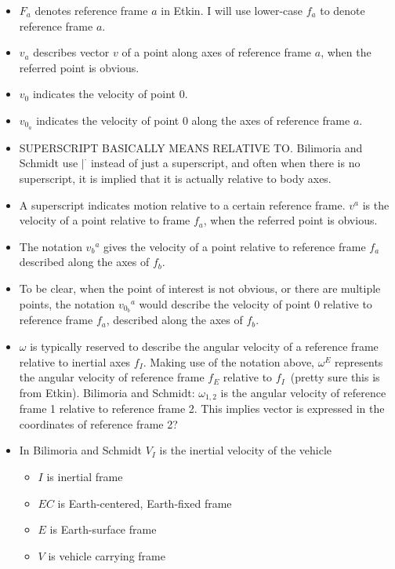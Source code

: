 \begin{itemize}
  \item{%
    $F_{a}$ denotes reference frame $a$ in Etkin.
    I will use lower-case $f_{a}$ to denote reference frame $a$.
  }
  \item{$v_{a}$ describes vector $v$ of a point along axes of reference frame $a$, when the referred point is obvious.}
  \item{$v_{0}$ indicates the velocity of point $0$.}
  \item{$v_{0_{a}}$ indicates the velocity of point $0$ along the axes of reference frame $a$.}
  \item{%
    SUPERSCRIPT BASICALLY MEANS RELATIVE TO.\@
    Bilimoria and Schmidt use $|^{\cdot}$ instead of just a superscript, and often when there is no superscript, it is implied that it is actually relative to body axes.
  }
  \item{%
    A superscript indicates motion relative to a certain reference frame.
    $v^{a}$ is the velocity of a point relative to frame $f_{a}$, when the referred point is obvious.
  }
  \item{The notation ${v_{b}}^{a}$ gives the velocity of a point relative to reference frame $f_{a}$ described along the axes of $f_{b}$.}
  \item{To be clear, when the point of interest is not obvious, or there are multiple points, the notation ${v_{0_{b}}}^{a}$ would describe the velocity of point $0$ relative to reference frame $f_{a}$, described along the axes of $f_{b}$.}
  \item{%
    $\omega$ is typically reserved to describe the angular velocity of a reference frame relative to inertial axes $f_{I}$.
    Making use of the notation above, $\omega^{E}$ represents the angular velocity of reference frame $f_{E}$ relative to $f_{I}$\ (pretty sure this is from Etkin).
    Bilimoria and Schmidt: $\omega_{1,2}$ is the angular velocity of reference frame 1 relative to reference frame 2.
    This implies vector is expressed in the coordinates of reference frame 2?
  }
  \item{In Bilimoria and Schmidt $V_{I}$ is the inertial velocity of the vehicle}
  \begin{itemize}
    \item{$I$ is inertial frame}
    \item{$EC$ is Earth-centered, Earth-fixed frame}
    \item{$E$ is Earth-surface frame}
    \item{$V$ is vehicle carrying frame}

\end{itemize}
\end{itemize}

